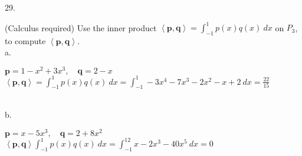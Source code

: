 \documentclass[12pt]{book}
\begin{document}
\begin{CJK}{UTF8}{bsmi}
29. \begin{minipage}[t]{\dimexpr\linewidth}
(Calculus required) Use the inner product $\displaystyle\left\langle \textbf{p},\textbf{q} \right\rangle=\int_{-1}^1p(x)q(x)\ dx$ on $P_3$, to compute $\left\langle \textbf{p},\textbf{q} \right\rangle$. \\
a. \begin{minipage}[t]{\dimexpr\linewidth}
$\textbf{p}=1-x^2+3x^3,\quad\textbf{q}=2-x$ \\
$\displaystyle\left\langle \textbf{p},\textbf{q} \right\rangle=\int_{-1}^1p(x)q(x)\ dx=\int_{-1}^1 -3x^4-7x^3-2x^2-x+2\ dx=\frac{22}{15}$
\end{minipage} \\
b. \begin{minipage}[t]{\dimexpr\linewidth}
$\textbf{p}=x-5x^3,\quad\textbf{q}=2+8x^2$ \\
$\displaystyle\left\langle \textbf{p},\textbf{q} \right\rangle\int_{-1}^1p(x)q(x)\ dx=\int_{-1}^12x-2x^3-40x^5\ dx=0$
\end{minipage}
\end{minipage}

\end{CJK}
\end{document}
